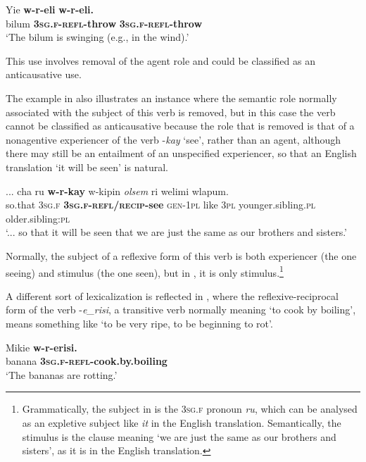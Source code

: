 \documentclass[output=paper]{langscibook}
\begin{document}
\ea%
    \label{ex:Brown:33}
    \gll Yie  \textbf{w-r-eli}  \textbf{w-r-eli.}\\
 bilum  \textbf{\textsc{3sg.f-refl}}\textbf{{}-throw}  \textbf{\textsc{3sg.f-refl}}\textbf{{}-throw}\\
    \glt ‘The bilum is swinging (e.g., in the wind).’
    \z

   

This use involves removal of the agent role and could be classified as an anticausative use.

  The example in  also illustrates an instance where the semantic role normally associated with the subject of this verb is removed, but in this case the verb cannot be classified as anticausative because the role that is removed is that of a nonagentive experiencer of the verb -\emph{kay} ‘see’, rather than an agent, although there may still be an entailment of an unspecified experiencer, so that an English translation ‘it will be seen’ is natural. 

\ea%
    \label{ex:Brown:34}
    \gll ...  cha  ru  \textbf{w-r-kay}  w-kipin  \textit{olsem}  ri welimi  wlapum.\\
   { } so.that  \textsc{3sg.f}  \textbf{\textsc{3sg.f-refl/recip}}\textbf{{}-see}  \textsc{gen}{}-\textsc{1pl}  like  \textsc{3pl} younger.sibling.\textsc{pl}  older.sibling:\textsc{pl}\\
    \glt ‘... so that it will be seen that we are just the same as our brothers and sisters.’
    \z


Normally, the subject of a reflexive form of this verb is both experiencer (the one seeing) and stimulus (the one seen), but in , it is only stimulus.\footnote{ Grammatically, the subject in  is the \textsc{3sg.f} pronoun \emph{ru}, which can be analysed as an expletive subject like \emph{it} in the English translation. Semantically, the stimulus is the clause meaning ‘we are just the same as our brothers and sisters’, as it is in the English translation.}



  A different sort of lexicalization is reflected in , where the reflexive-reciprocal form of the verb -\emph{e\_risi}, a transitive verb normally meaning ‘to cook by boiling’, means something like ‘to be very ripe, to be beginning to rot’. 



\ea%
    \label{ex:Brown:35}
    \gll  Mikie  \textbf{w-r-erisi.}\\
 banana  \textbf{\textsc{3sg.f-refl}}\textbf{{}-cook.by.boiling}\\
    \glt ‘The bananas are rotting.’
    \z
\end{document}
